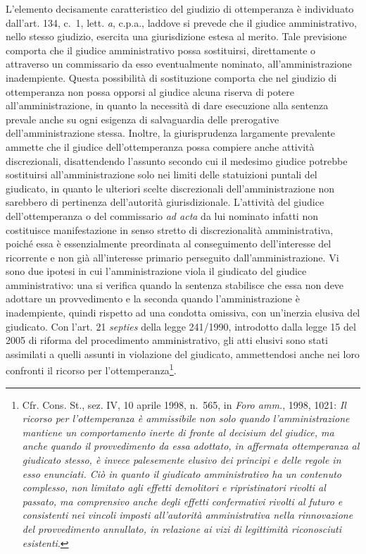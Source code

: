 \documentclass[12pt,it,a4paper,]{report}
\begin{document}
L'elemento decisamente caratteristico del giudizio di ottemperanza è
individuato dall'art. 134, c.~1, lett. \emph{a}, c.p.a., laddove si
prevede che il giudice amministrativo, nello stesso giudizio, esercita
una giurisdizione estesa al merito. Tale previsione comporta che il
giudice amministrativo possa sostituirsi, direttamente o attraverso un
commissario da esso eventualmente nominato, all'amministrazione
inadempiente. Questa possibilità di sostituzione comporta che nel
giudizio di ottemperanza non possa opporsi al giudice alcuna riserva di
potere all'amministrazione, in quanto la necessità di dare esecuzione
alla sentenza prevale anche su ogni esigenza di salvaguardia delle
prerogative dell'amministrazione stessa. Inoltre, la giurisprudenza
largamente prevalente ammette che il giudice dell'ottemperanza possa
compiere anche attività discrezionali, disattendendo l'assunto secondo
cui il medesimo giudice potrebbe sostituirsi all'amministrazione solo
nei limiti delle statuizioni puntali del giudicato, in quanto le
ulteriori scelte discrezionali dell'amministrazione non sarebbero di
pertinenza dell'autorità giurisdizionale. L'attività del giudice
dell'ottemperanza o del commissario \emph{ad acta} da lui nominato
infatti non costituisce manifestazione in senso stretto di
discrezionalità amministrativa, poiché essa è essenzialmente preordinata
al conseguimento dell'interesse del ricorrente e non già all'interesse
primario perseguito dall'amministrazione. Vi sono due ipotesi in cui
l'amministrazione viola il giudicato del giudice amministrativo: una si
verifica quando la sentenza stabilisce che essa non deve adottare un
provvedimento e la seconda quando l'amministrazione è inadempiente,
quindi rispetto ad una condotta omissiva, con un'inerzia elusiva del
giudicato. Con l'art. 21 \emph{septies} della legge 241/1990, introdotto
dalla legge 15 del 2005 di riforma del procedimento amministrativo, gli
atti elusivi sono stati assimilati a quelli assunti in violazione del
giudicato, ammettendosi anche nei loro confronti il ricorso per
l'ottemperanza\footnote{Cfr. Cons. St., sez. IV, 10 aprile 1998, n.~565,
  in \emph{Foro amm.}, 1998, 1021: \emph{Il ricorso per l'ottemperanza è
  ammissibile non solo quando l'amministrazione mantiene un
  comportamento inerte di fronte al decisium del giudice, ma anche
  quando il provvedimento da essa adottato, in affermata ottemperanza al
  giudicato stesso, è invece palesemente elusivo dei principi e delle
  regole in esso enunciati. Ciò in quanto il giudicato amministrativo ha
  un contenuto complesso, non limitato agli effetti demolitori e
  ripristinatori rivolti al passato, ma comprensivo anche degli effetti
  confermativi rivolti al futuro e consistenti nei vincoli imposti
  all'autorità amministrativa nella rinnovazione del provvedimento
  annullato, in relazione ai vizi di legittimità riconosciuti
  esistenti}.}.
\end{document}
